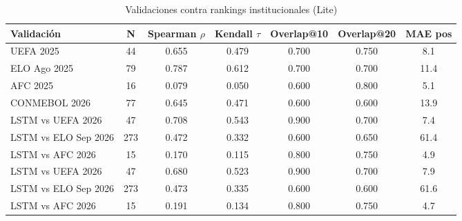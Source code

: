 \begin{table}[htbp]
\centering
\caption{Validaciones contra rankings institucionales (Lite)}
\label{tab:validaciones_lite}
\begin{tabular}{lcccccc}
\toprule
\textbf{Validación} & \textbf{N} & \textbf{Spearman $\rho$} & \textbf{Kendall $\tau$} & \textbf{Overlap@10} & \textbf{Overlap@20} & \textbf{MAE pos} \\
\midrule
UEFA 2025 & 44 & 0.655 & 0.479 & 0.700 & 0.750 & 8.1 \\
ELO Ago 2025 & 79 & 0.787 & 0.612 & 0.700 & 0.700 & 11.4 \\
AFC 2025 & 16 & 0.079 & 0.050 & 0.600 & 0.800 & 5.1 \\
CONMEBOL 2026 & 77 & 0.645 & 0.471 & 0.600 & 0.600 & 13.9 \\
LSTM vs UEFA 2026 & 47 & 0.708 & 0.543 & 0.900 & 0.700 & 7.4 \\
LSTM vs ELO Sep 2026 & 273 & 0.472 & 0.332 & 0.600 & 0.650 & 61.4 \\
LSTM vs AFC 2026 & 15 & 0.170 & 0.115 & 0.800 & 0.750 & 4.9 \\
LSTM vs UEFA 2026 & 47 & 0.680 & 0.523 & 0.900 & 0.700 & 7.9 \\
LSTM vs ELO Sep 2026 & 273 & 0.473 & 0.335 & 0.600 & 0.600 & 61.6 \\
LSTM vs AFC 2026 & 15 & 0.191 & 0.134 & 0.800 & 0.750 & 4.7 \\
\bottomrule
\end{tabular}
\end{table}